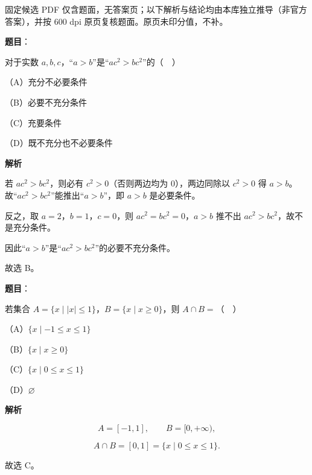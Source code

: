 
\begin{gktip}
固定候选 PDF 仅含题面，无答案页；以下解析与结论均由本库独立推导（非官方答案），并按 600 dpi 原页复核题面。原页未印分值，不补。
\end{gktip}

\begin{answer}

\textbf{题目}：

对于实数 $a,b,c$，“$a>b$”是“$ac^2>bc^2$”的（　）

（A）充分不必要条件

（B）必要不充分条件

（C）充要条件

（D）既不充分也不必要条件

\textbf{解析}

若 $ac^2>bc^2$，则必有 $c^2>0$（否则两边均为 $0$），两边同除以 $c^2>0$ 得 $a>b$。故“$ac^2>bc^2$”能推出“$a>b$”，即 $a>b$ 是必要条件。

反之，取 $a=2$，$b=1$，$c=0$，则 $ac^2=bc^2=0$，$a>b$ 推不出 $ac^2>bc^2$，故不是充分条件。

因此“$a>b$”是“$ac^2>bc^2$”的必要不充分条件。

故选 B。


\end{answer}
\begin{answer}

\textbf{题目}：

若集合 $A=\{x\mid |x|\leqslant1\}$，$B=\{x\mid x\geqslant0\}$，则 $A\cap B=$（　）

（A）$\{x\mid -1\leqslant x\leqslant1\}$

（B）$\{x\mid x\geqslant0\}$

（C）$\{x\mid 0\leqslant x\leqslant1\}$

（D）$\varnothing$

\textbf{解析}

\nopagebreak[4]
\[A=[-1,1],\qquad B=[0,+\infty),\]

\nopagebreak[4]
\[A\cap B=[0,1]=\{x\mid 0\leqslant x\leqslant1\}.\]

故选 C。


\end{answer}
